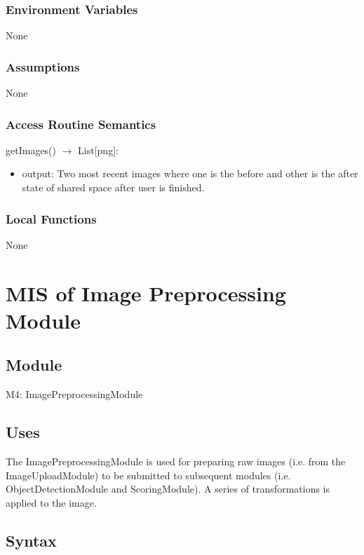 \documentclass[12pt, titlepage]{article}
\begin{document}
\subsubsection{Environment Variables}
None

\subsubsection{Assumptions}
None

\subsubsection{Access Routine Semantics}

\noindent getImages() $\rightarrow$ List[png]:
\begin{itemize}
\item output: Two most recent images where one is the before and other is the after state of shared space after user is finished.
\end{itemize}

\subsubsection{Local Functions}
None

\newpage


\section{MIS of Image Preprocessing Module} \label{Module} 

\subsection{Module}

M4: ImagePreprocessingModule

\subsection{Uses}
The ImagePreprocessingModule is used for preparing raw images (i.e. from the ImageUploadModule) to be submitted to subsequent modules (i.e. ObjectDetectionModule and ScoringModule). A series of transformations is applied to the image.

\subsection{Syntax}
\end{document}
